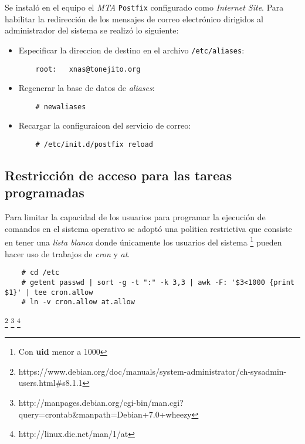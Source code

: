 Se instal\'{o} en el equipo el \textsl{MTA} \texttt{Postfix} configurado como \textit{Internet Site}. Para habilitar la redirecci\'{o}n de los mensajes de correo electr\'{o}nico dirigidos al administrador del sistema se realiz\'{o} lo siguiente:

\begin{itemize}
  \item Especificar la direccion de destino en el archivo \texttt{/etc/aliases}:

{
\scriptsize
\linespread{1}
\begin{verbatim}
    root:	xnas@tonejito.org
\end{verbatim}
}

  \item Regenerar la base de datos de \textit{aliases}:

{
\scriptsize
\linespread{1}
\begin{verbatim}
    # newaliases
\end{verbatim}
}

  \item Recargar la configuraicon del servicio de correo:

{
\scriptsize
\linespread{1}
\begin{verbatim}
    # /etc/init.d/postfix reload
\end{verbatim}
}

\end{itemize}

      \subsection {Restricci\'{o}n de acceso para las tareas programadas}

Para limitar la capacidad de los usuarios para programar la ejecuci\'{o}n de comandos en el sistema operativo se adopt\'{o} una politica restrictiva que consiste en tener una \textit{lista blanca} donde \'{u}nicamente los usuarios del sistema \footnote{Con \textbf{uid} menor a 1000} pueden hacer uso de trabajos de \textsl{cron} y \textsl{at}.

{
\scriptsize
\linespread{1}
\begin{verbatim}
    # cd /etc
    # getent passwd | sort -g -t ":" -k 3,3 | awk -F: '$3<1000 {print $1}' | tee cron.allow
    # ln -v cron.allow at.allow
\end{verbatim}
}
\footnote{https://www.debian.org/doc/manuals/system-administrator/ch-sysadmin-users.html\#s8.1.1}
\footnote{http://manpages.debian.org/cgi-bin/man.cgi?query=crontab\&manpath=Debian+7.0+wheezy}
\footnote{http://linux.die.net/man/1/at}

